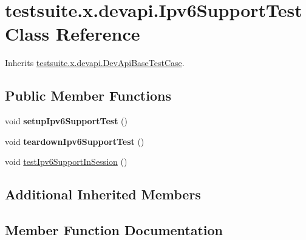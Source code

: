 \hypertarget{classtestsuite_1_1x_1_1devapi_1_1_ipv6_support_test}{}\section{testsuite.\+x.\+devapi.\+Ipv6\+Support\+Test Class Reference}
\label{classtestsuite_1_1x_1_1devapi_1_1_ipv6_support_test}


Inherits \mbox{\hyperlink{classtestsuite_1_1x_1_1devapi_1_1_dev_api_base_test_case}{testsuite.\+x.\+devapi.\+Dev\+Api\+Base\+Test\+Case}}.

\subsection*{Public Member Functions}
\begin{DoxyCompactItemize}
\item 
\mbox{\label{classtestsuite_1_1x_1_1devapi_1_1_ipv6_support_test_a38aacbbc480f9b7500c4f727641be981}} 
void {\bfseries setup\+Ipv6\+Support\+Test} ()
\item 
\mbox{\label{classtestsuite_1_1x_1_1devapi_1_1_ipv6_support_test_a34e03da98716f0156b07ebc05bf39dfb}} 
void {\bfseries teardown\+Ipv6\+Support\+Test} ()
\item 
void \mbox{\hyperlink{classtestsuite_1_1x_1_1devapi_1_1_ipv6_support_test_ad44a8fcc40b066934a89a590ed693517}{test\+Ipv6\+Support\+In\+Session}} ()
\end{DoxyCompactItemize}
\subsection*{Additional Inherited Members}


\subsection{Member Function Documentation}
\mbox{\label{classtestsuite_1_1x_1_1devapi_1_1_ipv6_support_test_ad44a8fcc40b066934a89a590ed693517}} 
